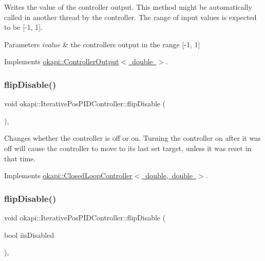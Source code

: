Writes the value of the controller output. This method might be automatically called in another thread by the controller. The range of input values is expected to be \mbox{[}-\/1, 1\mbox{]}.


\begin{DoxyParams}{Parameters}
{\em ivalue} & the controller\textquotesingle{}s output in the range \mbox{[}-\/1, 1\mbox{]} \\
\hline
\end{DoxyParams}


Implements \mbox{\hyperlink{classokapi_1_1ControllerOutput_a360c08f0c10b36f882d6d3100c2cad49}{okapi\+::\+Controller\+Output$<$ double $>$}}.

\mbox{\label{classokapi_1_1IterativePosPIDController_a8f7e1c7bc45f6b9df7a24edb60fc9e6a}} 
\subsubsection{\texorpdfstring{flipDisable()}{flipDisable()}\hspace{0.1cm}{\footnotesize\ttfamily [1/2]}}
{\footnotesize\ttfamily void okapi\+::\+Iterative\+Pos\+P\+I\+D\+Controller\+::flip\+Disable (\begin{DoxyParamCaption}{ }\end{DoxyParamCaption})\hspace{0.3cm}{\ttfamily [override]}, {\ttfamily [virtual]}}

Changes whether the controller is off or on. Turning the controller on after it was off will cause the controller to move to its last set target, unless it was reset in that time. 

Implements \mbox{\hyperlink{classokapi_1_1ClosedLoopController_a9de69b60885df41cd2164fe1a23f34d3}{okapi\+::\+Closed\+Loop\+Controller$<$ double, double $>$}}.

\mbox{\label{classokapi_1_1IterativePosPIDController_a5b0755a4839a25af4c5fa7f4e03398ca}} 
\subsubsection{\texorpdfstring{flipDisable()}{flipDisable()}\hspace{0.1cm}{\footnotesize\ttfamily [2/2]}}
{\footnotesize\ttfamily void okapi\+::\+Iterative\+Pos\+P\+I\+D\+Controller\+::flip\+Disable (\begin{DoxyParamCaption}\item[{bool}]{iis\+Disabled }\end{DoxyParamCaption})\hspace{0.3cm}{\ttfamily [override]}, {\ttfamily [virtual]}}

